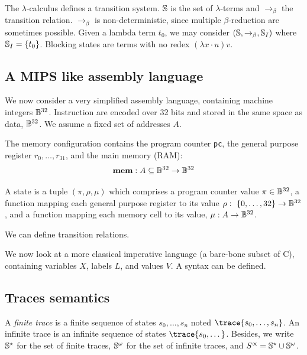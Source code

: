 \documentclass[toc, titlepaged]{../cs-classes/cs-classes}
\begin{document}
\begin{definition}
\end{definition}

The $\lambda$-calculus defines a transition system. $\S$ is the set of $\lambda$-terms and $\to_\beta$ the transition relation. $\to_\beta$ is non-deterministic, since multiple $\beta$-reduction are sometimes possible. Given a lambda term $t_0$, we may consider $(\S, \to_\beta, \S_I)$ where $\S_I = \{t_0\}$. Blocking states are terms with no redex $(\lambda x \cdot u)v$.

\subsection{A MIPS like assembly language}
We now consider a very simplified assembly language, containing machine integers $\B^{32}$. Instruction are encoded over 32 bits and stored in the same space as data, $\B^{32}$. We assume a fixed set of addresses $A$.

The memory configuration contains the program counter \texttt{pc}, the general purpose register $r_0, \dots, r_{31}$, and the main memory (RAM):
\begin{equation*}
    \mathbf{mem}:A\subseteq\B^{32}\to\B^{32}
\end{equation*}

\begin{definition}[State]
    A state is a tuple $(\pi, \rho, \mu)$ which comprises a program counter value $\pi\in\B^{32}$, a function mapping each general purpose register to its value $\rho : \{0, \dots, 32\} \to \B^{32}$, and a function mapping each memory cell to its value, $\mu:A\to\B^{32}$.
\end{definition}
We can define transition relations.

We now look at a more classical imperative language (a bare-bone subset of C), containing variables $X$, labels $L$, and values $V$. A syntax can be defined.

\subsection{Traces semantics}
\begin{definition}[Traces]
    A \emph{finite trace} is a finite sequence of states $s_0, \dots, s_n$ noted $\trace{s_0, \dots, s_n}$. An infinite trace is an infinite sequence of states $\trace{s_0, \dots}$. Besides, we write $\S^\star$ for the set of finite traces, $\S^\omega$ for the set of infinite traces, and $S^\propto=\S^\star\cup\S^\omega$.
\end{definition}
\end{document}
